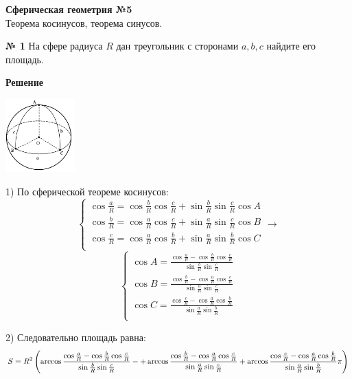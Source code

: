 


    \begin{center}
        \textbf{Сферическая геометрия №5}\\
        Теорема косинусов, теорема синусов.
    \end{center}

    \textbf{№ 1}
    На сфере радиуса $R$ дан треугольник с сторонами $a, b, c$ найдите его площадь.

    \textbf{Решение}\\

    \begin{center}
        \includegraphics[width=0.2\textwidth]{images/img3}\\
    \end{center}

    1) По сферической теореме косинусов:
    \[
        \begin{cases}
            \cos \frac{a}{R} = \cos \frac{b}{R}\cos\frac{c}{R} + \sin \frac{b}{R}\sin\frac{c}{R}\cos A\\
            \cos \frac{b}{R} = \cos \frac{a}{R}\cos\frac{c}{R} + \sin \frac{a}{R}\sin\frac{c}{R}\cos B\\
            \cos \frac{c}{R} = \cos \frac{a}{R}\cos\frac{b}{R} + \sin \frac{a}{R}\sin\frac{b}{R}\cos C\\
        \end{cases}
        \rightarrow
    \]
    \[
        \begin{cases}
            \cos A = \frac{\cos \frac{a}{R} - \cos \frac{b}{R}\cos\frac{c}{R}}{\sin \frac{b}{R}\sin\frac{c}{R}}\\
            \cos B = \frac{\cos \frac{b}{R} - \cos \frac{a}{R}\cos\frac{c}{R}}{\sin \frac{a}{R}\sin\frac{c}{R}}\\
            \cos C = \frac{\cos \frac{c}{R} - \cos \frac{a}{R}\cos\frac{b}{R}}{\sin \frac{a}{R}\sin\frac{b}{R}}\\
        \end{cases}
    \]

    2) Следовательно площадь равна:
    \[
        S = R^2\left(\arccos \frac{\cos \frac{a}{R} - \cos \frac{b}{R}\cos\frac{c}{R}}{\sin \frac{b}{R}\sin\frac{c}{R}} -
        + \arccos  \frac{\cos \frac{b}{R} - \cos \frac{a}{R}\cos\frac{c}{R}}{\sin \frac{a}{R}\sin\frac{c}{R}}
        + \arccos \frac{\cos \frac{c}{R} - \cos \frac{a}{R}\cos\frac{b}{R}}{\sin \frac{a}{R}\sin\frac{b}{R}}\\
        \pi\right)
    \]\\


